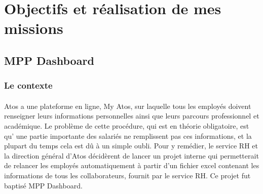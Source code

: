 \documentclass[12pt]{article}
\begin{document}
\begin {sloppypar}
\section {Objectifs et réalisation de mes missions}
\subsection {MPP Dashboard}
\subsubsection {Le contexte} \paragraph {}
Atos a une plateforme en ligne, My Atos, sur laquelle tous les employés doivent 
renseigner leurs informations personnelles ainsi que leurs parcours professionnel et 
académique. Le problème de cette procédure, qui est en théorie obligatoire, est qu' 
une partie importante des salariés ne remplissent pas ces informations, et la plupart 
du temps cela est dû à un simple oubli. Pour y remédier, le service RH et la direction 
général d'Atos décidèrent de lancer un projet interne qui permetterait de relancer 
les employés automatiquement à partir d'un fichier excel contenant les informations 
de tous les collaborateurs, fournit par le service RH. Ce projet fut baptisé MPP Dashboard.


\end{sloppypar}
\end{document}
